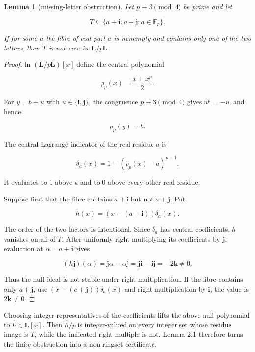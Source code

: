 \documentclass[11pt]{article}
\newtheorem{lemma}[theorem]{Lemma}
\theoremstyle{remark}
\numberwithin{equation}{section}
\begin{document}
\begin{lemma}[missing-letter obstruction]

Let $p\equiv3\pmod4$ be prime and let

\[
T\subseteq\{a+\mathbf i,a+\mathbf j:a\in\mathbb F_p\}.
\]

If for some $a$ the fibre of real part $a$ is nonempty and contains only one
of the two letters, then $T$ is not core in $\mathbf L/p\mathbf L$.

\end{lemma}
\begin{proof}

In $(\mathbf L/p\mathbf L)[x]$ define the central polynomial

\[
\rho_p(x)=\frac{x+x^p}{2}.
\]

For $y=b+u$ with $u\in\{\mathbf i,\mathbf j\}$, the congruence
$p\equiv3\pmod4$ gives $u^p=-u$, and hence

\[
\rho_p(y)=b.
\]

The central Lagrange indicator of the real residue $a$ is

\[
\delta_a(x)=1-(\rho_p(x)-a)^{p-1}.
\]

It evaluates to $1$ above $a$ and to $0$ above every other real residue.

Suppose first that the fibre contains $a+\mathbf i$ but not
$a+\mathbf j$. Put

\[
h(x)=(x-(a+\mathbf i))\delta_a(x).
\]

The order of the two factors is intentional. Since $\delta_a$ has central
coefficients, $h$ vanishes on all of $T$. After uniformly right-multiplying
its coefficients by $\mathbf j$, evaluation at $\alpha=a+\mathbf i$ gives

\[
(h\mathbf j)(\alpha)
=\mathbf j\alpha-\alpha\mathbf j
=\mathbf j\mathbf i-\mathbf i\mathbf j
=-2\mathbf k\ne0.
\]

Thus the null ideal is not stable under right multiplication. If the fibre
contains only $a+\mathbf j$, use
$(x-(a+\mathbf j))\delta_a(x)$ and right multiplication by $\mathbf i$;
the value is $2\mathbf k\ne0$.
\end{proof}

Choosing integer representatives of the coefficients lifts the above null
polynomial to $\widehat h\in\mathbf L[x]$. Then
$\widehat h/p$ is integer-valued on every integer set whose residue image is
$T$, while the indicated right multiple is not. Lemma 2.1 therefore turns
the finite obstruction into a non-ringset certificate.
\end{document}
